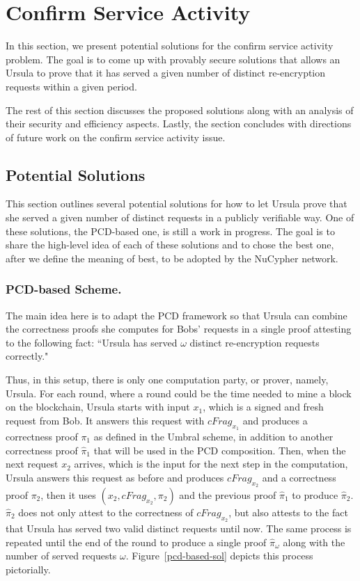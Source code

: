 \section{Confirm Service Activity}
\label{confirm-service-activity}
In this section, we present potential solutions for the confirm service activity 
problem. The goal is to come up with provably secure solutions that allows an 
Ursula to prove that it has served a given number of distinct re-encryption 
requests within a given period. 


The rest of this section discusses the proposed solutions along with an analysis of 
their security and efficiency aspects. Lastly, the section concludes with directions of 
future work on the confirm service activity issue.


\subsection{Potential Solutions}
\label{solutions}
This section outlines several potential solutions for how to let Ursula prove 
that she served a given number of distinct requests in a publicly verifiable way. 
One of these solutions, the PCD-based one, is still a work in progress. The goal 
is to share the high-level idea of each of these solutions and to chose the best one,
after we define the meaning of best, to be adopted by the NuCypher network.


\subsubsection{PCD-based Scheme.}
The main idea here is to adapt the PCD framework so that Ursula
can combine the correctness proofs she computes for Bobs' requests in a single proof 
attesting to the following fact: ``Ursula has served $\omega$ distinct re-encryption 
requests correctly." 


Thus, in this setup, there is only one computation party, or prover, namely, Ursula. 
For each round, where a round could be the time needed to mine a block on the 
blockchain, Ursula starts with input $x_1$, which is a signed and fresh request
from Bob. It answers this request with $cFrag_{x_1}$ and produces a correctness 
proof $\pi_1$ as defined in the Umbral scheme, in addition to another correctness 
proof $\hat{\pi}_1$ that will be used in the PCD composition. Then, when the next request $x_2$ arrives, 
which is the input for the next step in the computation, Ursula answers 
this request as before and produces $cFrag_{x_2}$ and a correctness proof $\pi_2$, then 
it uses $(x_2, cFrag_{x_2}, \pi_2)$ and the previous proof $\hat{\pi}_1$ to produce $\hat{\pi}_2$. 
$\hat{\pi}_2$ does not only 
attest to the correctness of $cFrag_{x_2}$, but also attests to the fact that Ursula has served 
two valid distinct requests until now. The same process is repeated until the end of the 
round to produce a single proof $\hat{\pi}_{\omega}$ along with the number of 
served requests $\omega$. Figure~\ref{pcd-based-sol} depicts 
this process pictorially.


